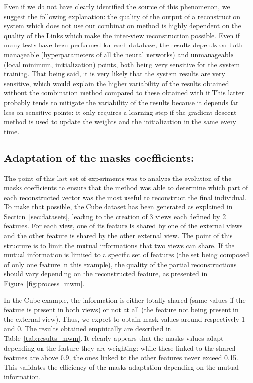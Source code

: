 Even if we do not have clearly identified the source of this phenomenon, we suggest the following explanation: the quality of the output of a reconstruction system which does not use our combination method is highly dependent on the quality of the Links which make the inter-view reconstruction possible. Even if many tests have been performed for each database, the results depends on both manageable (hyperparameters of all the neural networks) and unmanageable (local minimum, initialization) points, both being very sensitive for the system training. That being said, it is very likely that the system results are very sensitive, which would explain the higher variability of the results obtained without the combination method compared to these obtained with it.\@ This latter probably tends to mitigate the variability of the results because it depends far less on sensitive points: it only requires a learning step if the gradient descent method is used to update the weights and the initialization in the same every time.

\subsection{Adaptation of the masks coefficients:}
\label{sec:results_mwm}
The point of this last set of experiments was to analyze the evolution of the masks coefficients to ensure that the method was able to determine which part of each reconstructed vector was the most useful to reconstruct the final individual. To make that possible, the Cube dataset has been generated as explained in Section~\ref{sec:datasets}, leading to the creation of 3 views each defined by 2 features. For each view, one of its feature is shared by one of the external views and the other feature is shared by the other external view. The point of this structure is to limit the mutual informations that two views can share. If the mutual information is limited to a specific set of features (the set being composed of only one feature in this example), the quality of the partial reconstructions should vary depending on the reconstructed feature, as presented in Figure~\ref{fig:process_mwm}.

In the Cube example, the information is either totally shared (same values if the feature is present in both views) or not at all (the feature not being present in the external view). Thus, we expect to obtain mask values around respectively 1 and 0. The results obtained empirically are described in Table~\ref{tab:results_mwm}. It clearly appears that the masks values adapt depending on the feature they are weighting: while these linked to the shared features are above 0.9, the ones linked to the other features never exceed 0.15. This validates the efficiency of the masks adaptation depending on the mutual information. 

